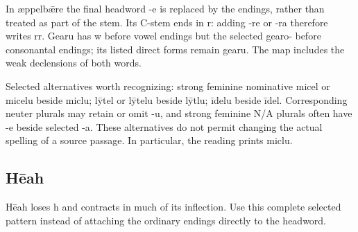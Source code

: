 In æppelbǣre the final headword -e is replaced by the endings, rather than treated as part of the stem. Its C-stem ends in r: adding -re or -ra therefore writes rr. Gearu has w before vowel endings but the selected gearo- before consonantal endings; its listed direct forms remain gearu. The map includes the weak declensions of both words.

Selected alternatives worth recognizing: strong feminine nominative micel or micelu beside miclu; lȳtel or lȳtelu beside lȳtlu; īdelu beside īdel. Corresponding neuter plurals may retain or omit -u, and strong feminine N/\allowbreak{}A plurals often have -e beside selected -a. These alternatives do not permit changing the actual spelling of a source passage. In particular, the reading prints miclu.

\subsection*{Hēah}

Hēah loses h and contracts in much of its inflection. Use this complete selected pattern instead of attaching the ordinary endings directly to the headword.

